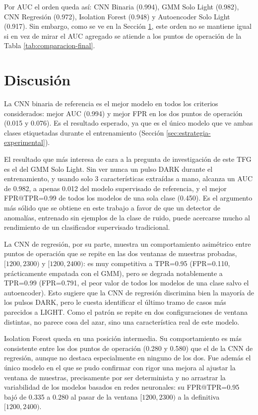 Por AUC el orden queda así: CNN Binaria (0.994), GMM Solo Light (0.982), CNN Regresión (0.972), Isolation Forest (0.948) y Autoencoder Solo Light (0.917). Sin embargo, como se ve en la Sección \ref{sec:discusion-resultados}, este orden no se mantiene igual si en vez de mirar el AUC agregado se atiende a los puntos de operación de la Tabla \ref{tab:comparacion-final}.


\section{Discusión}
\label{sec:discusion-resultados}

La CNN binaria de referencia es el mejor modelo en todos los criterios considerados: mejor AUC (0.994) y mejor FPR en los dos puntos de operación (0.015 y 0.076). Es el resultado esperado, ya que es el único modelo que ve ambas clases etiquetadas durante el entrenamiento (Sección \ref{sec:estrategia-experimental}).

El resultado que más interesa de cara a la pregunta de investigación de este TFG es el del GMM Solo Light. Sin ver nunca un pulso DARK durante el entrenamiento, y usando solo 3 características extraídas a mano, alcanza un AUC de 0.982, a apenas 0.012 del modelo supervisado de referencia, y el mejor FPR@TPR=0.99 de todos los modelos de una sola clase (0.450). Es el argumento más sólido que se obtiene en este trabajo a favor de que un detector de anomalías, entrenado sin ejemplos de la clase de ruido, puede acercarse mucho al rendimiento de un clasificador supervisado tradicional.

La CNN de regresión, por su parte, muestra un comportamiento asimétrico entre puntos de operación que se repite en las dos ventanas de muestras probadas, $[1200, 2300)$ y $[1200, 2400)$: es muy competitiva a TPR=0.95 (FPR=0.110, prácticamente empatada con el GMM), pero se degrada notablemente a TPR=0.99 (FPR=0.791, el peor valor de todos los modelos de una clase salvo el autoencoder). Esto sugiere que la CNN de regresión discrimina bien la mayoría de los pulsos DARK, pero le cuesta identificar el último tramo de casos más parecidos a LIGHT. Como el patrón se repite en dos configuraciones de ventana distintas, no parece cosa del azar, sino una característica real de este modelo.

Isolation Forest queda en una posición intermedia. Su comportamiento es más consistente entre los dos puntos de operación (0.280 y 0.580) que el de la CNN de regresión, aunque no destaca especialmente en ninguno de los dos. Fue además el único modelo en el que se pudo confirmar con rigor una mejora al ajustar la ventana de muestras, precisamente por ser determinista y no arrastrar la variabilidad de los modelos basados en redes neuronales: su FPR@TPR=0.95 bajó de 0.335 a 0.280 al pasar de la ventana $[1200, 2300)$ a la definitiva $[1200, 2400)$.

